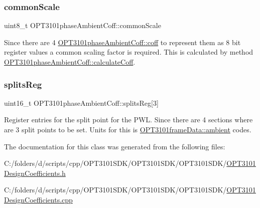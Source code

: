 \subsubsection{\texorpdfstring{common\+Scale}{commonScale}}
{\footnotesize\ttfamily uint8\+\_\+t O\+P\+T3101phase\+Ambient\+Coff\+::common\+Scale}



Since there are 4 \mbox{\hyperlink{class_o_p_t3101phase_ambient_coff_a0174483b15a3819cf8b30fcad00f7dda}{O\+P\+T3101phase\+Ambient\+Coff\+::coff}} to represent them as 8 bit register values a common scaling factor is required. This is calculated by method \mbox{\hyperlink{class_o_p_t3101phase_ambient_coff_a926e3a0dcadac3172c34982bbf8e1bbe}{O\+P\+T3101phase\+Ambient\+Coff\+::calculate\+Coff}}. 

\mbox{\label{class_o_p_t3101phase_ambient_coff_ae784da8b9f3bf0af13e2ebaff6c980fb}} 
\subsubsection{\texorpdfstring{splits\+Reg}{splitsReg}}
{\footnotesize\ttfamily uint16\+\_\+t O\+P\+T3101phase\+Ambient\+Coff\+::splits\+Reg\mbox{[}3\mbox{]}}



Register entries for the split point for the P\+WL. Since there are 4 sections where are 3 split points to be set. Units for this is \mbox{\hyperlink{class_o_p_t3101frame_data_a901d8630d15b79b558e7d7c5a9d08cc7}{O\+P\+T3101frame\+Data\+::ambient}} codes. 



The documentation for this class was generated from the following files\+:\begin{DoxyCompactItemize}
\item 
C\+:/folders/d/scripts/cpp/\+O\+P\+T3101\+S\+D\+K/\+O\+P\+T3101\+S\+D\+K/\+O\+P\+T3101\+S\+D\+K/\mbox{\hyperlink{_o_p_t3101_design_coefficients_8h}{O\+P\+T3101\+Design\+Coefficients.\+h}}\item 
C\+:/folders/d/scripts/cpp/\+O\+P\+T3101\+S\+D\+K/\+O\+P\+T3101\+S\+D\+K/\+O\+P\+T3101\+S\+D\+K/\mbox{\hyperlink{_o_p_t3101_design_coefficients_8cpp}{O\+P\+T3101\+Design\+Coefficients.\+cpp}}\end{DoxyCompactItemize}
